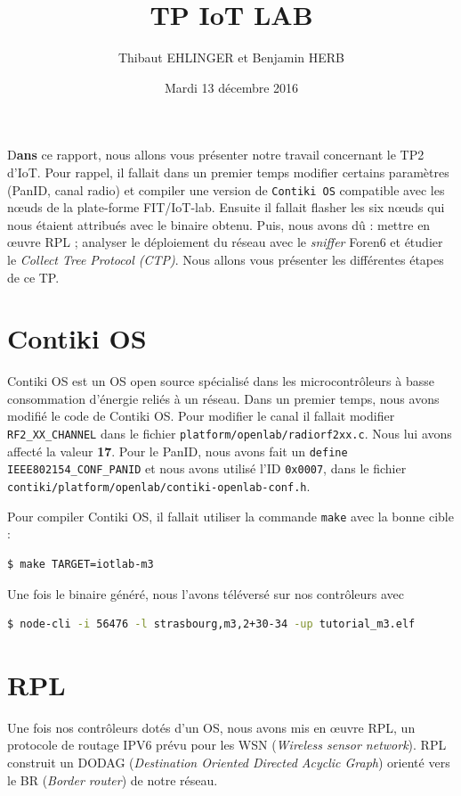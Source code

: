 \documentclass[	DIV=calc,%
							paper=a4,%
							fontsize=11pt,%
			  ]{scrartcl}	 					%
\title{TP IoT LAB}					%
\author{Thibaut EHLINGER et Benjamin HERB }											%
\date{Mardi 13 décembre 2016}
\newcommand{\initial}[1]{%
     \lettrine[lines=3,lhang=0.3,nindent=0em]{
     				\color{DarkGoldenrod}
     				{\textsf{#1}}}{}}
\begin{document}
\maketitle
\thispagestyle{fancy} 			%

\initial{D}\textbf{ans} ce rapport, nous allons vous présenter notre travail concernant le TP2 d'IoT. Pour rappel, il fallait dans un premier temps modifier  certains paramètres (PanID, canal radio) et compiler une version de \texttt{Contiki OS} compatible avec les nœuds de la plate-forme FIT/IoT-lab. Ensuite il fallait flasher les six nœuds qui nous étaient attribués avec le binaire obtenu. Puis, nous avons dû : mettre en œuvre RPL ; analyser le déploiement du réseau avec le \textit{sniffer} Foren6 et étudier le \textit{Collect Tree Protocol (CTP)}.  Nous allons vous présenter les différentes étapes de ce TP.


\section{Contiki OS}
Contiki OS est un OS open source spécialisé dans les microcontrôleurs à basse consommation d'énergie reliés à un réseau. Dans un premier temps, nous avons modifié le code de Contiki OS. Pour modifier le canal il fallait modifier \texttt{RF2\_XX\_CHANNEL} dans le fichier \texttt{platform/openlab/radiorf2xx.c}. Nous lui avons affecté la valeur \textbf{17}. Pour le PanID, nous avons fait un \texttt{define IEEE802154\_CONF\_PANID} et nous avons utilisé l'ID \texttt{0x0007}, dans le fichier 
\texttt{contiki/platform/openlab/contiki-openlab-conf.h}.

Pour compiler Contiki OS, il fallait utiliser la commande \texttt{make} avec la bonne cible :
\begin{lstlisting}[language=bash]
$ make TARGET=iotlab-m3
\end{lstlisting}

Une fois le binaire généré, nous l'avons téléversé sur nos contrôleurs avec 
\begin{lstlisting}[language=bash]
$ node-cli -i 56476 -l strasbourg,m3,2+30-34 -up tutorial_m3.elf
\end{lstlisting}

\section{RPL}
Une fois nos contrôleurs dotés d'un OS, nous avons mis en œuvre RPL, un protocole de routage IPV6 prévu pour les WSN (\textit{Wireless sensor network}). RPL construit un DODAG (\textit{Destination Oriented Directed Acyclic Graph}) orienté vers le BR (\textit{Border router}) de notre réseau.
\end{document}
